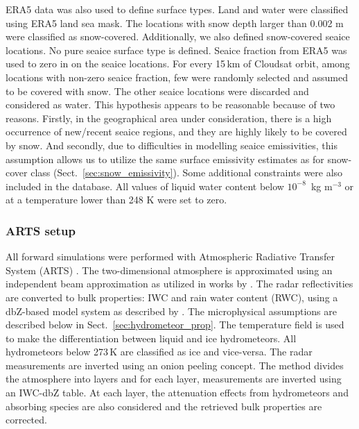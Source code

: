 \documentclass[amt, manuscript]{copernicus}
\begin{document}
ERA5 data was also used to define surface types. Land and water were classified using ERA5 land sea mask. The locations with snow depth larger than 0.002\,\,m were classified as snow-covered. Additionally, we also defined snow-covered seaice locations. No pure seaice surface type is defined. Seaice fraction from ERA5 was used to zero in on the seaice locations. For every 15\,km of Cloudsat orbit, among locations with non-zero seaice fraction, few were randomly selected and assumed to be covered with snow. The other seaice locations were discarded
and considered as water. This hypothesis appears to be reasonable because of two reasons. Firstly, in the geographical area under consideration, there is a high occurrence of new/recent seaice regions, and they are highly likely to be covered by snow. And secondly, due to difficulties in modelling seaice emissivities, this assumption allows us to utilize the same surface emissivity estimates as for snow-cover class  (Sect.~\ref{sec:snow_emissivity}).  Some additional constraints were also included in the database. All values of liquid water content below $10^{-8}$ \,kg m$^{-3}$ or at a temperature lower than 248\,\,K were set to zero.







\subsubsection{ARTS setup}
%
\label{sec:arts_setup}

All forward simulations were performed with Atmospheric Radiative Transfer System (ARTS) \citep{eriksson:arts2:11}. The two-dimensional atmosphere is approximated using an independent beam approximation as utilized in works by \citet{ekelund2020using, eriksson:towar:20}. 
The radar reflectivities are converted to bulk properties: IWC and rain water content (RWC), using a dbZ-based model system as described by \citet{ekelund2020using}. The microphysical assumptions are described below in Sect.~\ref{sec:hydrometeor_prop}. The temperature field is used to make the differentiation between liquid and ice hydrometeors. All hydrometeors below 273\,K are classified as ice and vice-versa. The radar measurements are inverted using an onion peeling concept. The method  divides the atmosphere into layers and for each layer, measurements are inverted using an IWC-dbZ table. At each layer, the attenuation effects from hydrometeors and absorbing species are also considered and the retrieved bulk properties are corrected. 
\end{document}
